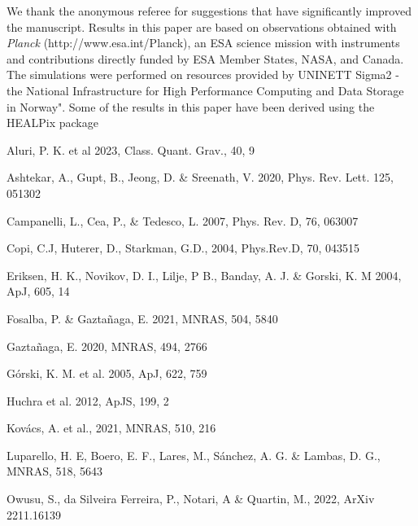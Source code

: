 \documentclass{aa}
\begin{document}
\begin{acknowledgements}
We thank the anonymous referee for suggestions that have significantly improved the manuscript.
Results in this paper are based on observations obtained with \textit{Planck}
(http://www.esa.int/Planck), an ESA science mission with instruments
and contributions directly funded by ESA Member States, NASA, and
Canada. The simulations were performed on resources provided by 
UNINETT Sigma2 - the National Infrastructure for High Performance Computing and 
Data Storage in Norway". Some of the results in this paper have been derived using the HEALPix package \citep{healpix}
\end{acknowledgements}


\begin{thebibliography}{}

 Aluri, P. K. et al 2023, Class. Quant. Grav., 40, 9 

 Ashtekar, A., Gupt, B., Jeong, D. \& Sreenath, V. 2020, Phys. Rev. Lett. 125, 051302

 Campanelli, L., Cea, P., \& Tedesco, L. 2007, Phys. Rev. D, 76, 063007
  
 Copi, C.J, Huterer, D., Starkman, G.D., 2004, Phys.Rev.D, 70, 043515

 Eriksen, H. K., Novikov, D. I., Lilje, P B., Banday, A. J. \& Gorski, K. M 2004, ApJ, 605, 14 
  
 Fosalba, P. \& Gaztañaga, E. 2021, MNRAS, 504, 5840

  Gaztañaga, E. 2020, MNRAS, 494, 2766
  
 Górski, K. M. et al. 2005, ApJ, 622, 759
  
 Huchra et al. 2012, ApJS, 199, 2

 Kovács, A. et al., 2021, MNRAS, 510, 216

 Luparello, H. E, Boero, E. F., Lares, M., Sánchez, A. G. \& Lambas, D. G., MNRAS, 518, 5643

 Owusu, S., da Silveira Ferreira, P., Notari, A \& Quartin, M., 2022, ArXiv 2211.16139


\end{thebibliography}
\end{document}
